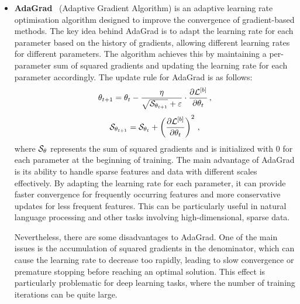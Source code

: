 \begin{itemize}[leftmargin=1.5em]
    \item\textbf{AdaGrad}~\supercite{adagrad} (Adaptive Gradient Algorithm) is an adaptive learning rate optimisation algorithm designed to improve the convergence of gradient-based methods. The key idea behind AdaGrad is to adapt the learning rate for each parameter based on the history of gradients, allowing different learning rates for different parameters. The algorithm achieves this by maintaining a per-parameter sum of squared gradients and updating the learning rate for each parameter accordingly. The update rule for AdaGrad is as follows:
    \begin{equation}
        \theta_{t+1} = \theta_{t} - \dfrac{\eta}{\sqrt{\mathcal{S}_{\theta_{t+1}}} + \varepsilon} \cdot\dfrac{\partial \mathcal{L}^{[b]}}{\partial \theta_{t}}\,,
    \end{equation}
    \begin{equation}
        \mathcal{S}_{\theta_{t+1}} = \mathcal{S}_{\theta_{t}} + \left(\dfrac{\partial \mathcal{L}^{[b]}}{\partial \theta_{t}}\right)^2\,,
    \end{equation}
    where $\mathcal{S}_{\theta}$ represents the sum of squared gradients and is initialized with 0 for each parameter at the beginning of training. The main advantage of AdaGrad is its ability to handle sparse features and data with different scales effectively. By adapting the learning rate for each parameter, it can provide faster convergence for frequently occurring features and more conservative updates for less frequent features. This can be particularly useful in natural language processing and other tasks involving high-dimensional, sparse data.

    Nevertheless, there are some disadvantages to AdaGrad. One of the main issues is the accumulation of squared gradients in the denominator, which can cause the learning rate to decrease too rapidly, leading to slow convergence or premature stopping before reaching an optimal solution. This effect is particularly problematic for deep learning tasks, where the number of training iterations can be quite large.


\end{itemize}
